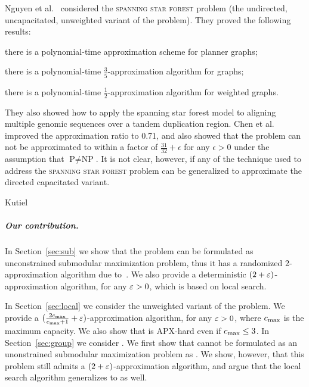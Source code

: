Nguyen et al.~\cite{nguyen2008approximating} considered
the \textsc{spanning star forest} problem (the undirected,
uncapacitated, unweighted variant of the problem).  They proved the
following results:
\begin{inparaenum}[(i)]
\item there is a polynomial-time approximation scheme for planner graphs;
\item there is a polynomial-time $\frac{3}{5}$-approximation algorithm for graphs;
\item there is a polynomial-time $\frac{1}{2}$-approximation algorithm for weighted graphs.
\end{inparaenum}
They also showed how to apply the spanning star forest model to
aligning multiple genomic sequences over a tandem duplication region.
Chen et al.~\cite{chen2007improved} improved the approximation ratio
to 0.71, and also showed that the problem can not be approximated to
within a factor of $\frac{31}{32} + \epsilon$ for any $\epsilon > 0$
under the assumption that $\text{P} \neq \text{NP}$.  It is not clear,
however, if any of the technique used to address the
\textsc{spanning star forest} problem can be generalized to approximate the
directed capacitated variant.

Kutiel~\cite{Kutiel16}




\subparagraph{Our contribution.}
%
In Section~\ref{sec:sub} we show that the problem can be formulated as
unconstrained submodular maximization problem, thus it has a
randomized $2$-approximation algorithm due to~\cite{BFNS15}.  We also
provide a deterministic $(2+\varepsilon)$-approximation algorithm, for any
$\varepsilon>0$, which is based on local search.

In Section~\ref{sec:local} we consider the unweighted variant of the
problem.  We provide a $(\frac{2c_{\max}}{c_{\max}+1} + \varepsilon)$-approximation
algorithm, for any $\varepsilon>0$, where $c_{\max}$ is the maximum capacity.
We also show that \carpool is APX-hard even if $c_{\max} \leq 3$.
%
In Section~\ref{sec:group} we consider \gcp.  We first show that \gcp
cannot be formulated as an unonstrained submodular maximization
problem as \carpool.  We show, however, that this problem still admits
a $(2 + \varepsilon)$-approximation algorithm, and argue that the local
search algorithm generalizes to \gcp as well.
